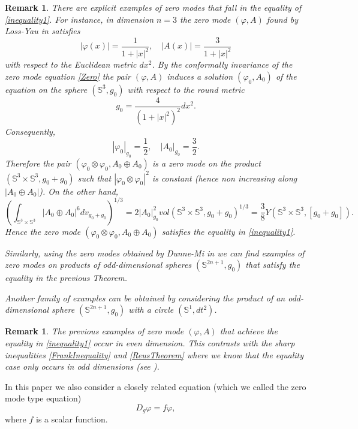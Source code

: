 \documentclass[11pt]{amsart}
\theoremstyle{plain}
\newtheorem{remark}[theorem]{Remark}
\numberwithin{equation}{section}
\theoremstyle{plain}
\begin{document}
\begin{remark}
There are explicit examples of zero modes that fall  in the equality of \eqref{inequality1}. For instance, in dimension $n=3$ the zero mode $(\varphi,A)$ found by Loss-Yau in \cite{Loss-Yau} satisfies  $$|\varphi(x)|=\frac{1}{1+|x|^2},\quad |A(x)|=\frac{3}{1+|x|^2}$$
with respect to the Euclidean metric $dx^2$.
By the conformally invariance of the zero mode equation \eqref{Zero} the pair  $(\varphi,A)$ induces a solution $(\varphi_0,A_0)$ of the equation on the sphere $(\mathbb{S}^3,g_0)$ with respect to the round metric $$g_0=\frac{4}{\left(1+|x|^2\right)^2}dx^2.$$
Consequently, $$|\varphi_0|_{g_0}=\frac{1}{2},\quad |A_0|_{g_0}=\frac{3}{2}.$$
Therefore the pair $(\varphi_0\otimes\varphi_0,A_0\oplus A_0)$ is a zero mode on the product $(\mathbb{S}^3\times\mathbb{S}^3,g_0+ g_0)$ such that $|\varphi_0\otimes\varphi_0|^2$ is constant (hence non increasing along $|A_0\oplus A_0|$). On the other hand,
$$\left(\int_{\mathbb{S}^3\times\mathbb{S}^3}|A_0\oplus A_0|^6dv_{g_0+g_0}\right)^{1/3}=2|A_0|^2_{g_0}vol(\mathbb{S}^3\times\mathbb{S}^3,g_0+g_0)^{1/3}=\frac{3}{8}Y(\mathbb{S}^3\times\mathbb{S}^3,[g_0+g_0]).$$
Hence the zero mode $(\varphi_0\otimes\varphi_0,A_0\oplus A_0)$ satisfies the equality in \eqref{inequality1}.


Similarly, using the zero modes obtained by Dunne-Mi in \cite{Dunne} we can find examples of zero modes on products of odd-dimensional spheres $(\mathbb{S}^{2n+1},g_0)$ that satisfy  the equality in the previous Theorem.

Another family of examples can be obtained by considering the product of an odd-dimensional sphere $(\mathbb{S}^{2n+1},g_0)$ with a circle $(\mathbb{S}^1,dt^2)$.

\end{remark}

\begin{remark}


The previous examples of zero mode $(\varphi,A)$ that achieve the equality in \eqref{inequality1} occur in even dimension. This contrasts with the sharp inequalities \eqref{FrankInequality} and \eqref{ReusTheorem} where we know that the equality case only occurs in odd dimensions (see \cite{Frank-Loss2,Wang}).
\end{remark}

In this paper we also consider a closely related equation (which we called the zero mode type equation)
\begin{equation}\label{zero-type}
D_g\varphi=f\varphi,
\end{equation}
where $f$ is a scalar function.
\end{document}
